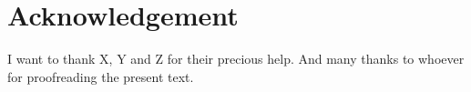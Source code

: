 {}
\chapter*{Acknowledgement}

I want to thank X, Y and Z for their precious help.
And many thanks to whoever for proofreading the present text.

\newpage